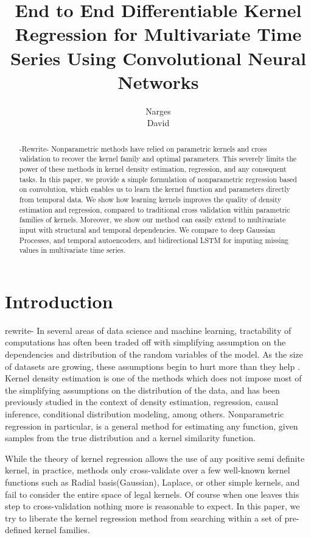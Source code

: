 \documentclass{article} %
\title{End to End Differentiable Kernel Regression for Multivariate Time Series Using Convolutional Neural Networks}
\author{
Narges \\
\AND
David
}
\begin{document}
\maketitle
\begin{abstract}
-Rewrite- Nonparametric methods have relied on parametric kernels and cross validation to recover the kernel family and optimal parameters. This severely limits the power of these methods in kernel density estimation, regression, and any consequent tasks. In this paper, we provide a simple formulation of nonparametric regression based on convolution, which enables us to learn the kernel function and parameters directly from temporal data. We show how learning kernels improves the quality of density estimation and regression, compared to traditional cross validation within parametric families of kernels. Moreover, we show our method can easily extend to multivariate input with structural and temporal dependencies. We compare to deep Gaussian Processes, and temporal autoencoders, and bidirectional LSTM for imputing missing values in multivariate time series.
\end{abstract}

\section{Introduction}

rewrite- In several areas of data science and machine learning, tractability of computations has often been traded off with simplifying assumption on the dependencies and distribution of the random variables of the model.\cite{} \cite{} \cite{} \cite{} As the size of datasets are growing, these assumptions begin to hurt more than they help \cite{} \cite{} \cite{}. Kernel density estimation\cite{} is one of the methods which does not impose most of the simplifying assumptions on the distribution of the data\cite{}, and has been previously studied in the context of density estimation, regression, causal inference, conditional distribution modeling, among others. Nonparametric regression\cite{} in particular, is a general method for estimating any function, given samples from the true distribution and a kernel similarity function.

While the theory of kernel regression allows the use of any positive semi definite kernel, in practice, methods only cross-validate over a few well-known kernel functions such as Radial basis(Gaussian), Laplace, or other simple kernels, and fail to consider the entire space of legal kernels. Of course when one leaves this step to cross-validation nothing more is reasonable to expect. In this paper, we try to liberate the kernel regression method from searching within a set of pre-defined kernel families.
\end{document}
